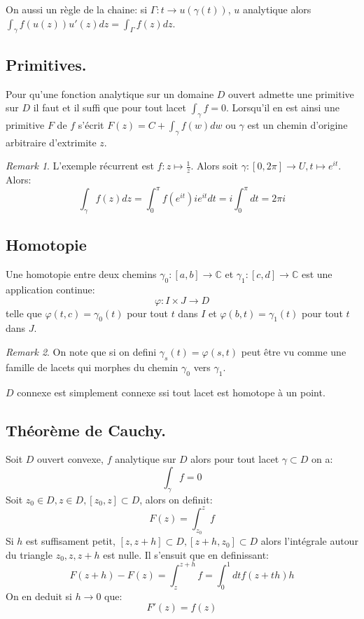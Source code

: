 \documentclass[10pt,a4paper]{article}
\theoremstyle{definition}
\theoremstyle{theorem}
\theoremstyle{remark}
\newtheorem*{remark}{Remark}
\begin{document}
 On aussi un règle de la chaine: si $\Gamma : t \rightarrow u(\gamma(t))$, $u$ analytique alors $\int_\gamma f(u(z))u'(z) dz = \int_\Gamma f(z) dz$.

\subsection{Primitives.}
\theorem Pour qu'une fonction analytique sur un domaine $D$ ouvert admette une primitive sur $D$ il faut et il suffi que pour tout lacet $\int_\gamma f = 0$.
\prop Lorsqu'il en est ainsi une primitive $F$ de $f$ s'écrit $F(z) = C + \int_\gamma f(w) d w$ ou $\gamma$ est un chemin d'origine arbitraire d'extrimite $z$. 
\begin{remark}
L'exemple récurrent est $f : z \mapsto \frac{1}{z}$. Alors soit $\gamma : [0, 2\pi] \to U, t\mapsto e^{it}$. Alors:
$$
\int_\gamma f(z) dz = \int_0^\pi f(e^{it}) i e^{it} dt = i \int_0^\pi dt = 2 \pi i 
$$
\end{remark}
\subsection{Homotopie}
 Une homotopie entre deux chemins $\gamma_0 : [a,b] \rightarrow \mathbb{C}$ et $\gamma_1 : [c, d] \rightarrow \mathbb{C}$ est une application continue:
$$
\varphi : I \times J \rightarrow D
$$
telle que $\varphi(t,c) = \gamma_0(t)$ pour tout $t$ dans $I$ et $\varphi(b, t) = \gamma_1(t)$ pour tout $t$ dans $J$.
\begin{remark}
On note que si on defini $\gamma_s (t) = \varphi(s,t)$ peut être vu comme une famille de lacets qui morphes du chemin $\gamma_0$ vers $\gamma_1$.
\end{remark}
 $D$ connexe est simplement connexe ssi tout lacet est homotope à un point.

\subsection{Théorème de Cauchy.}
\theorem Soit $D$ ouvert convexe, $f$ analytique sur $D$ alors pour tout lacet $\gamma \subset D$ on a:
$$
\int_\gamma f = 0
$$
\proof Soit $z_0 \in D, z \in D, [z_0, z] \subset D$, alors on definit:
$$
F(z) = \int_{z_0}^z f
$$
Si $h$ est suffisament petit, $[z, z + h] \subset D, [z + h, z_0] \subset D$ alors l'intégrale autour du triangle $z_0, z, z + h$ est nulle. Il s'ensuit que en definissant:
$$
F(z + h) - F(z) = \int_z^{z+h} f = \int_0^1 dt f(z + th) h 
$$
On en deduit si $h \rightarrow 0$ que:
$$
F'(z) = f(z)
$$
\end{document}
